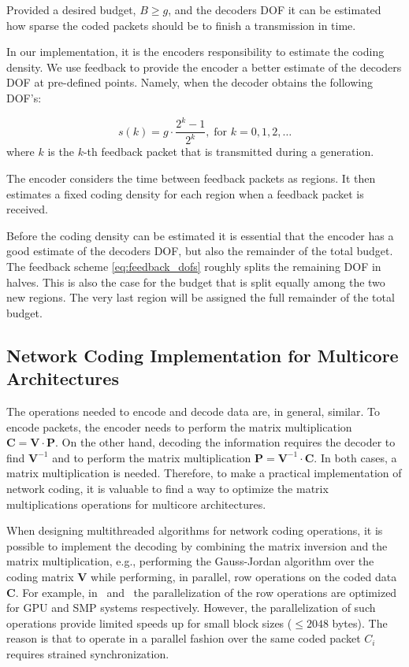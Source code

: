 Provided a desired budget, $B \geq g$, and the decoders \ac{DOF} it can be
estimated how sparse the coded packets should be to finish a transmission in
time.

In our implementation, it is the encoders responsibility to estimate the coding
density. We use feedback to provide the encoder a better estimate of the
decoders \ac{DOF} at pre-defined points. Namely, when the decoder obtains the
following \ac{DOF}'s:

\begin{equation}\label{eq:feedback_dofs}
    s(k) = g\cdot \frac{2^k -1}{2^k},  \; \text{for } k=0,1,2,\dots
\end{equation}
where $k$ is the $k$-th feedback packet that is transmitted during a generation.

The encoder considers the time between feedback packets as regions. It then
estimates a fixed coding density for each region when a feedback packet is
received.

Before the coding density can be estimated it is essential that the encoder
has a good estimate of the decoders \ac{DOF}, but also the remainder of the
total budget. The feedback scheme \ref{eq:feedback_dofs} roughly splits the
remaining \ac{DOF} in halves. This is also the case for the budget that is
split equally among the two new regions. The very last region will be assigned
the full remainder of the total budget.

\subsection{Network Coding Implementation for Multicore Architectures}
\label{sub:implementation-multicore}

The operations needed to encode and decode data are, in general, similar. To
encode packets, the encoder needs to perform the matrix multiplication
$\textbf{C} = \textbf{V} \cdot \textbf{P}$. On the other hand, decoding the
information requires the decoder to find $\textbf{V}^{-1}$ and to perform the
matrix multiplication $\textbf{P} = \textbf{V}^{-1} \cdot \textbf{C}$. In both
cases, a matrix multiplication is needed. Therefore, to make a practical
implementation of network coding, it is valuable to find a way to optimize the
matrix multiplications operations for multicore architectures.

When designing multithreaded algorithms for network coding operations, it is
possible to implement the decoding by combining the matrix inversion and the
matrix multiplication, e.g., performing the Gauss-Jordan algorithm over the
coding matrix $\textbf{V}$ while performing, in parallel, row operations on the
coded data $\textbf{C}$. For example, in~\cite{5061951} and~\cite{4262451} the
parallelization of the row operations are optimized for \ac{GPU} and \ac{SMP}
systems respectively. However, the parallelization of such operations provide
limited speeds up for small block sizes ($\leq 2048$ bytes). The reason is that
to operate in a parallel fashion over the same coded packet $C_i$ requires
strained synchronization.

